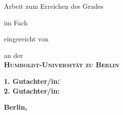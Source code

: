 \makeatletter
\begin{titlepage}
\doublespacing\centering%
\textbf{\Huge \@title}\vskip 2.5mm

\textbf{\Large \@subtitle}\vfill

{\large Arbeit zum Erreichen des Grades}\\
\textbf{\Large\degreevar}\vfill

{\large im Fach}\\
\resizebox{%
      \ifdim\width>\textwidth
        \textwidth
      \else
        \width
      \fi
    }{!}{%
    \textbf{\Large\programmevar}}\vfill

{\large eingereicht von}\\
\resizebox{%
      \ifdim\width>\textwidth
        \textwidth
      \else
        \width
      \fi
    }{!}{%
    \textbf{\Large \@author}}\vfill

{\large an der}\\
\textbf{\Large\scshape Humboldt-Universität zu Berlin}\vfill%

\resizebox{%
      \ifdim\width>\textwidth
        \textwidth
      \else
        \width
      \fi
    }{!}{%
    \textbf{\Large\scshape\facultyvar}}%

\resizebox{%
      \ifdim\width>\textwidth
        \textwidth
      \else
        \width
      \fi
    }{!}{%
    \textbf{\Large\scshape\institutevar}}\vfill

\parbox{0cm}{\large%
    \begin{tabbing}
        \textbf{1. Gutachter/in:} \= \firstsupervisorvar\\
        \textbf{2. Gutachter/in:} \> \secondsupervisorvar
    \end{tabbing}
}\vfill


\enlargethispage{16mm}\textbf{\large Berlin, \@date}
\end{titlepage}
\makeatother